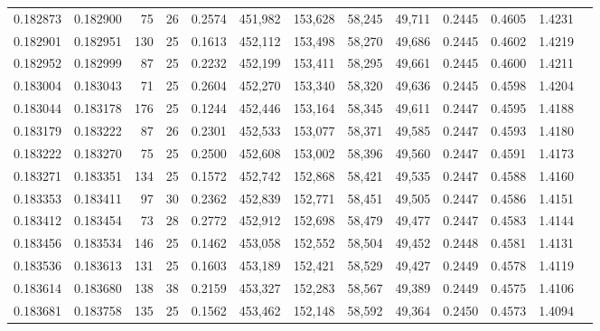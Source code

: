 \begin{tabular}{rrrrrrrrrrrrr}
0.182873 & 0.182900 &  75 &  26 &                                     0.2574 & 451,982 & 153,628 &  58,245 &  49,711 & 0.2445 & 0.4605 & 1.4231 \\
0.182901 & 0.182951 & 130 &  25 &                                     0.1613 & 452,112 & 153,498 &  58,270 &  49,686 & 0.2445 & 0.4602 & 1.4219 \\
0.182952 & 0.182999 &  87 &  25 &                                     0.2232 & 452,199 & 153,411 &  58,295 &  49,661 & 0.2445 & 0.4600 & 1.4211 \\
0.183004 & 0.183043 &  71 &  25 &                                     0.2604 & 452,270 & 153,340 &  58,320 &  49,636 & 0.2445 & 0.4598 & 1.4204 \\
0.183044 & 0.183178 & 176 &  25 &                                     0.1244 & 452,446 & 153,164 &  58,345 &  49,611 & 0.2447 & 0.4595 & 1.4188 \\
0.183179 & 0.183222 &  87 &  26 &                                     0.2301 & 452,533 & 153,077 &  58,371 &  49,585 & 0.2447 & 0.4593 & 1.4180 \\
0.183222 & 0.183270 &  75 &  25 &                                     0.2500 & 452,608 & 153,002 &  58,396 &  49,560 & 0.2447 & 0.4591 & 1.4173 \\
0.183271 & 0.183351 & 134 &  25 &                                     0.1572 & 452,742 & 152,868 &  58,421 &  49,535 & 0.2447 & 0.4588 & 1.4160 \\
0.183353 & 0.183411 &  97 &  30 &                                     0.2362 & 452,839 & 152,771 &  58,451 &  49,505 & 0.2447 & 0.4586 & 1.4151 \\
0.183412 & 0.183454 &  73 &  28 &                                     0.2772 & 452,912 & 152,698 &  58,479 &  49,477 & 0.2447 & 0.4583 & 1.4144 \\
0.183456 & 0.183534 & 146 &  25 &                                     0.1462 & 453,058 & 152,552 &  58,504 &  49,452 & 0.2448 & 0.4581 & 1.4131 \\
0.183536 & 0.183613 & 131 &  25 &                                     0.1603 & 453,189 & 152,421 &  58,529 &  49,427 & 0.2449 & 0.4578 & 1.4119 \\
0.183614 & 0.183680 & 138 &  38 &                                     0.2159 & 453,327 & 152,283 &  58,567 &  49,389 & 0.2449 & 0.4575 & 1.4106 \\
0.183681 & 0.183758 & 135 &  25 &                                     0.1562 & 453,462 & 152,148 &  58,592 &  49,364 & 0.2450 & 0.4573 & 1.4094 \\

\end{tabular}
